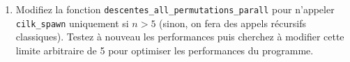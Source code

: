 \documentclass{cours}
\newcommand{\lsti}[1]{\lstinline{#1}{}}
\begin{document}
\begin{exercice}
\begin{enumerate}
\item Modifiez la fonction \lsti{descentes_all_permutations_parall} pour n'appeler \lsti{cilk_spawn} uniquement si $n > 5$ (sinon, on fera des appels récursifs classiques). Testez à nouveau les performances puis cherchez à modifier cette limite arbitraire de 5 pour optimiser les performances du programme.

\end{enumerate}

\end{exercice}
\end{document}
